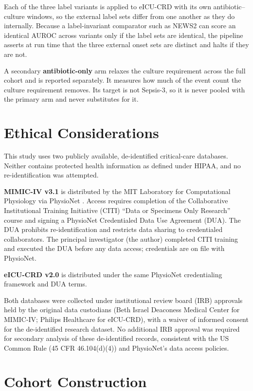 Each of the three label variants is applied to eICU-CRD with its own
antibiotic--culture windows, so the external label sets differ from one another
as they do internally. Because a label-invariant comparator such as NEWS2 can
score an identical AUROC across variants only if the label sets are identical,
the pipeline asserts at run time that the three external onset sets are
distinct and halts if they are not.

A secondary \textbf{antibiotic-only} arm relaxes the culture requirement across
the full cohort and is reported separately. It measures how much of the event
count the culture requirement removes. Its target is not Sepsis-3, so it is
never pooled with the primary arm and never substitutes for it.


\section{Ethical Considerations}
\label{sec:ethics}

This study uses two publicly available, de-identified critical-care databases.
Neither contains protected health information as defined under HIPAA, and no
re-identification was attempted.

\textbf{MIMIC-IV v3.1} is distributed by the MIT Laboratory for Computational
Physiology via PhysioNet \cite{johnson2023mimiciv}. Access requires completion
of the Collaborative Institutional Training Initiative (CITI) ``Data or
Specimens Only Research'' course and signing a PhysioNet Credentialed Data Use
Agreement (DUA). The DUA prohibits re-identification and restricts data sharing
to credentialed collaborators. The principal investigator (the author) completed
CITI training and executed the DUA before any data access; credentials are on
file with PhysioNet.

\textbf{eICU-CRD v2.0} \cite{pollard2018eicu} is distributed under the same
PhysioNet credentialing framework and DUA terms.

Both databases were collected under institutional review board (IRB) approvals
held by the original data custodians (Beth Israel Deaconess Medical Center for
MIMIC-IV; Philips Healthcare for eICU-CRD), with a waiver of informed consent
for the de-identified research dataset. No additional IRB approval was required
for secondary analysis of these de-identified records, consistent with the US
Common Rule (45 CFR 46.104(d)(4)) and PhysioNet's data access policies.


\section{Cohort Construction}
\label{sec:cohort}

